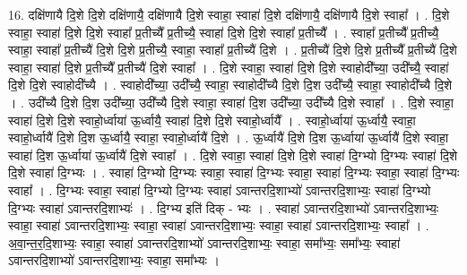 \documentclass[17pt]{extarticle}
\begin{document}
16. दक्षि॑णायै दि॒शे दि॒शे दक्षि॑णायै॒ दक्षि॑णायै दि॒शे स्वाहा॒ स्वाहा॑ दि॒शे दक्षि॑णायै॒ दक्षि॑णायै दि॒शे स्वाहा᳚ । . दि॒शे स्वाहा॒ स्वाहा॑ दि॒शे दि॒शे स्वाहा᳚ प्र॒तीच्यै᳚ प्र॒तीच्यै॒ स्वाहा॑ दि॒शे दि॒शे स्वाहा᳚ प्र॒तीच्यै᳚ । . स्वाहा᳚ प्र॒तीच्यै᳚ प्र॒तीच्यै॒ स्वाहा॒ स्वाहा᳚ प्र॒तीच्यै॑ दि॒शे दि॒शे प्र॒तीच्यै॒ स्वाहा॒ स्वाहा᳚ प्र॒तीच्यै॑ दि॒शे । . प्र॒तीच्यै॑ दि॒शे दि॒शे प्र॒तीच्यै᳚ प्र॒तीच्यै॑ दि॒शे स्वाहा॒ स्वाहा॑ दि॒शे प्र॒तीच्यै᳚ प्र॒तीच्यै॑ दि॒शे स्वाहा᳚ । . दि॒शे स्वाहा॒ स्वाहा॑ दि॒शे दि॒शे स्वाहोदी᳚च्या॒ उदी᳚च्यै॒ स्वाहा॑ दि॒शे दि॒शे स्वाहोदी᳚च्यै । . स्वाहोदी᳚च्या॒ उदी᳚च्यै॒ स्वाहा॒ स्वाहोदी᳚च्यै दि॒शे दि॒श उदी᳚च्यै॒ स्वाहा॒ स्वाहोदी᳚च्यै दि॒शे । . उदी᳚च्यै दि॒शे दि॒श उदी᳚च्या॒ उदी᳚च्यै दि॒शे स्वाहा॒ स्वाहा॑ दि॒श उदी᳚च्या॒ उदी᳚च्यै दि॒शे स्वाहा᳚ । . दि॒शे स्वाहा॒ स्वाहा॑ दि॒शे दि॒शे स्वाहो॒र्ध्वाया॑ ऊ॒र्ध्वायै॒ स्वाहा॑ दि॒शे दि॒शे स्वाहो॒र्ध्वायै᳚ । . स्वाहो॒र्ध्वाया॑ ऊ॒र्ध्वायै॒ स्वाहा॒ स्वाहो॒र्ध्वायै॑ दि॒शे दि॒श ऊ॒र्ध्वायै॒ स्वाहा॒ स्वाहो॒र्ध्वायै॑ दि॒शे । . ऊ॒र्ध्वायै॑ दि॒शे दि॒श ऊ॒र्ध्वाया॑ ऊ॒र्ध्वायै॑ दि॒शे स्वाहा॒ स्वाहा॑ दि॒श ऊ॒र्ध्वाया॑ ऊ॒र्ध्वायै॑ दि॒शे स्वाहा᳚ । . दि॒शे स्वाहा॒ स्वाहा॑ दि॒शे दि॒शे स्वाहा॑ दि॒ग्भ्यो दि॒ग्भ्यः स्वाहा॑ दि॒शे दि॒शे स्वाहा॑ दि॒ग्भ्यः । . स्वाहा॑ दि॒ग्भ्यो दि॒ग्भ्यः स्वाहा॒ स्वाहा॑ दि॒ग्भ्यः स्वाहा॒ स्वाहा॑ दि॒ग्भ्यः स्वाहा॒ स्वाहा॑ दि॒ग्भ्यः स्वाहा᳚ । . दि॒ग्भ्यः स्वाहा॒ स्वाहा॑ दि॒ग्भ्यो दि॒ग्भ्यः स्वाहा॑ ऽवान्तरदि॒शाभ्यो॑ ऽवान्तरदि॒शाभ्यः॒ स्वाहा॑ दि॒ग्भ्यो दि॒ग्भ्यः स्वाहा॑ ऽवान्तरदि॒शाभ्यः॑ । . दि॒ग्भ्य इति॑ दिक् - भ्यः । . स्वाहा॑ ऽवान्तरदि॒शाभ्यो॑ ऽवान्तरदि॒शाभ्यः॒ स्वाहा॒ स्वाहा॑ ऽवान्तरदि॒शाभ्यः॒ स्वाहा॒ स्वाहा॑ ऽवान्तरदि॒शाभ्यः॒ स्वाहा॒ स्वाहा॑ ऽवान्तरदि॒शाभ्यः॒ स्वाहा᳚ । . अ॒वा॒न्त॒र॒दि॒शाभ्यः॒ स्वाहा॒ स्वाहा॑ ऽवान्तरदि॒शाभ्यो॑ ऽवान्तरदि॒शाभ्यः॒ स्वाहा॒ समा᳚भ्यः॒ समा᳚भ्यः॒ स्वाहा॑ ऽवान्तरदि॒शाभ्यो॑ ऽवान्तरदि॒शाभ्यः॒ स्वाहा॒ समा᳚भ्यः । \newline
\end{document}
